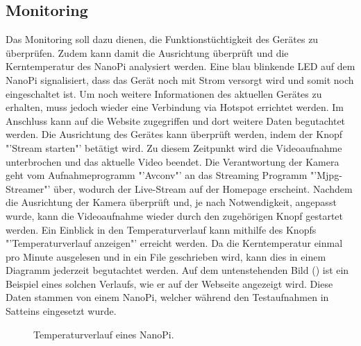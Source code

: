 \subsection{Monitoring}
Das Monitoring soll dazu dienen, die Funktionstüchtigkeit des Gerätes zu überprüfen. Zudem kann damit die Ausrichtung überprüft und die Kerntemperatur des NanoPi analysiert werden. Eine blau blinkende LED auf dem NanoPi signalisiert, dass das Gerät noch mit Strom versorgt wird und somit noch eingeschaltet ist. Um noch weitere Informationen des aktuellen Gerätes zu erhalten, muss jedoch wieder eine Verbindung via Hotspot errichtet werden. Im Anschluss kann auf die Website zugegriffen und dort weitere Daten begutachtet werden. Die Ausrichtung des Gerätes kann überprüft werden, indem der Knopf "'Stream starten"' betätigt wird. Zu diesem Zeitpunkt wird die Videoaufnahme unterbrochen und das aktuelle Video beendet. Die Verantwortung der Kamera geht vom Aufnahmeprogramm "'Avconv"' an das Streaming Programm "'Mjpg-Streamer"' über, wodurch der Live-Stream auf der Homepage erscheint. Nachdem die Ausrichtung der Kamera überprüft und, je nach Notwendigkeit, angepasst wurde, kann die Videoaufnahme wieder durch den zugehörigen Knopf gestartet werden. Ein Einblick in den Temperaturverlauf kann mithilfe des Knopfs "'Temperaturverlauf anzeigen"' erreicht werden. Da die Kerntemperatur einmal pro Minute ausgelesen und in ein File geschrieben wird, kann dies in einem Diagramm jederzeit begutachtet werden. Auf dem untenstehenden Bild () ist ein Beispiel eines solchen Verlaufs, wie er auf der Webseite angezeigt wird. Diese Daten stammen von einem NanoPi, welcher während den Testaufnahmen in Satteins eingesetzt wurde.

\begin{figure}[H]
  \centering
  \caption{Temperaturverlauf eines NanoPi.}
  \label{bTemperature}
\end{figure} 